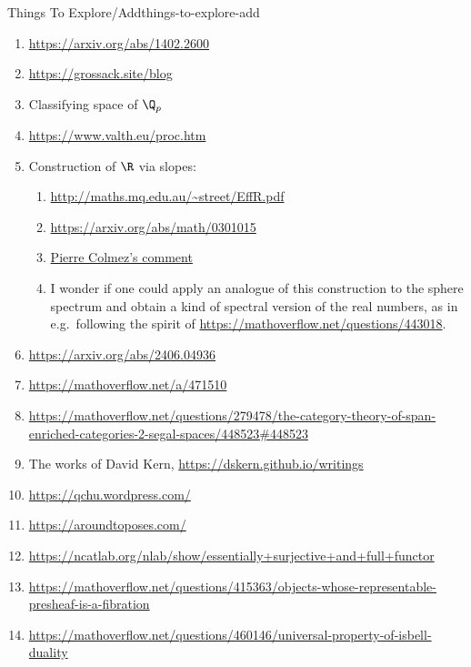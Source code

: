 \begin{remark}{Things To Explore/Add}{things-to-explore-add}
\begin{enumerate}
\begin{align*}
                \alpha_{n+1}\circ d^{V}_{n}+d^{W}_{n-1}\circ\alpha_{n} &= g_{n}-f_{n},\\
                \beta_{n+1}\circ d^{V}_{n}+d^{W}_{n-1}\circ\beta_{n}   &= k_{n}-h_{n}.
            \end{align*}
        \item \url{https://arxiv.org/abs/1402.2600}
        \item \url{https://grossack.site/blog}
        \item Classifying space of $\Q_{p}$
        \item \url{https://www.valth.eu/proc.htm}
        \item Construction of $\R$ via slopes:
            \begin{enumerate}
                \item \url{http://maths.mq.edu.au/~street/EffR.pdf}
                \item \url{https://arxiv.org/abs/math/0301015}
                \item \href{https://twitter.com/ColmezPierre/status/1809308351643165181?t=KAESWH44ufE7486diGcxrA}{Pierre Colmez's comment }
                \item I wonder if one could apply an analogue of this construction to the sphere spectrum and obtain a kind of spectral version of the real numbers, as in e.g.\ following the spirit of \href{MO 443018}{https://mathoverflow.net/questions/443018}.
            \end{enumerate}
        \item \url{https://arxiv.org/abs/2406.04936}
        \item \url{https://mathoverflow.net/a/471510}
        \item \url{https://mathoverflow.net/questions/279478/the-category-theory-of-span-enriched-categories-2-segal-spaces/448523#448523}
        \item The works of David Kern, \url{https://dskern.github.io/writings}
        \item \url{https://qchu.wordpress.com/}
        \item \url{https://aroundtoposes.com/}
        \item \url{https://ncatlab.org/nlab/show/essentially+surjective+and+full+functor}
        \item \url{https://mathoverflow.net/questions/415363/objects-whose-representable-presheaf-is-a-fibration}
        \item \url{https://mathoverflow.net/questions/460146/universal-property-of-isbell-duality}

\end{enumerate}
\end{remark}
